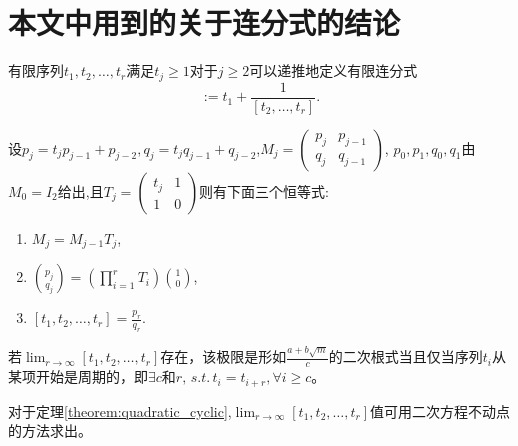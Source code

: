 \section{本文中用到的关于连分式的结论}\label{C_F}
\begin{definition}
  有限序列$t_1,t_2,\dots,t_r$满足$t_j\geq 1$对于$j\geq2$可以递推地定义有限连分式
  \begin{equation}
  [t_1,t_2,\dots,t_r]:=t_1+\frac{1} {[t_2,\dots,t_r]}.
  \end{equation}
\end{definition}
\begin{theorem}\label{thm:basic}
  设$p_j=t_j p_{j-1}+p_{j-2},q_j=t_j q_{j-1}+q_{j-2}$,$M_j=\left(\begin{matrix}p_j&p_{j-1}\\q_j&q_{j-1}\end{matrix}\right)$,
  $p_0,p_1,q_0,q_1$由$M_0=I_2$给出,且$T_j=\left(\begin{matrix}t_j&1\\1&0\end{matrix}\right)$则有下面三个恒等式:
  \begin{enumerate}
    \item $M_j=M_{j-1}T_j$,
    \item $\binom{p_j}{q_j}=(\prod_{i=1}^r T_i )\binom{1}{0}$,
    \item $[t_1,t_2,\dots,t_r]=\frac{p_r}{q_r}$.
  \end{enumerate}
\end{theorem}
\begin{theorem}\label{theorem:quadratic_cyclic}
若$\lim_{r\to \infty}[t_1,t_2,\dots,t_r]$存在，该极限是形如$\frac{a+b\sqrt{m}}{c}$的二次根式当且仅当序列$t_i$从某项开始是周期的，即$\exists c\text{和}r,\,s.t.\, t_{i}=t_{i+r},\forall i\geq c$。
\end{theorem}
\begin{remark}

对于定理\ref{theorem:quadratic_cyclic},$\lim_{r\to \infty}[t_1,t_2,\dots,t_r]$值可用二次方程不动点的方法求出\cite{ContinuedFraction}。
\end{remark}
